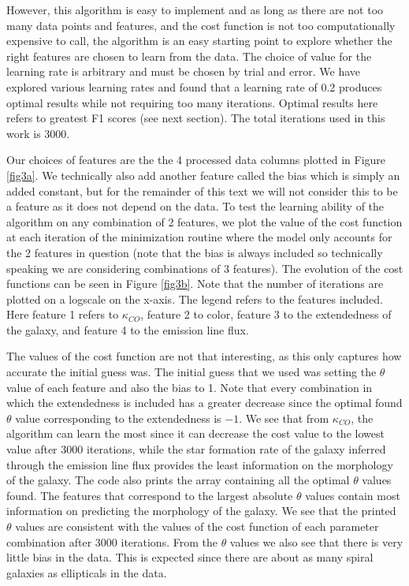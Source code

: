 \documentclass{article}
\begin{document}
However, this algorithm is easy to implement and as long as there are not too many data points and features,
and the cost function is not too computationally expensive to call, the algorithm is an easy starting point
to explore whether the right features are chosen to learn from the data. 
The choice of value for the learning rate is arbitrary and must be chosen by trial and error.
We have explored various learning rates and found that a learning rate of 0.2 produces optimal results 
while not requiring too many iterations. Optimal results here refers to greatest F1 scores (see next section).
The total iterations used in this work is 3000.

Our choices of features are the the 4 processed data columns plotted in Figure \ref{fig3a}.
We technically also add another feature called the bias which is simply an added constant, but for 
the remainder of this text we will not consider this to be a feature as it does not 
depend on the data. 
To test the learning ability of the algorithm on any combination of 2 features, we plot 
the value of the cost function at each iteration of the minimization routine where the model 
only accounts for the 2 features in question (note that the bias is always included so technically speaking 
we are considering combinations of 3 features). 
The evolution of the cost functions can be seen in Figure \ref{fig3b}.
Note that the number of iterations are plotted on a logscale on the x-axis.
The legend refers to the features included. 
Here feature 1 refers to $\kappa_{CO}$, feature 2 to color, feature 3 to the extendedness of the galaxy,
and feature 4 to the emission line flux. 

The values of the cost function are not that interesting, as this only captures how accurate the initial 
guess was. The initial guess that we used was setting the $\theta$ value of each feature and also the bias to 1. 
Note that every combination in which the extendedness is included has a greater decrease since the optimal found $\theta$ value 
corresponding to the extendedness is $-1$. We see that from $\kappa_{CO}$, the algorithm can learn the most since it
can decrease the cost value to the lowest value after 3000 iterations, while the star formation rate of the galaxy inferred through the 
emission line flux provides the least information on the morphology of the galaxy. 
The code also prints the array containing all the optimal $\theta$ values found.
The features that correspond to the largest absolute $\theta$ values contain most information 
on predicting the morphology of the galaxy. We see that the printed $\theta$ values are consistent 
with the values of the cost function of each parameter combination after 3000 iterations.
From the $\theta$ values we also see that there is very little bias in the data. 
 This is expected since there are about as many spiral galaxies as ellipticals in the data.  
\end{document}
